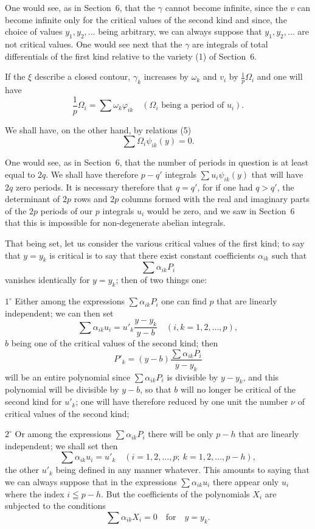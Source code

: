 \documentclass{article}
\begin{document}
One would see, as in Section~6, that the $\gamma$ cannot become infinite, since the $v$ can become infinite only for the critical values of the second kind and since, the choice of values $y_{1}, y_{2}, \ldots$ being arbitrary, we can always suppose that $y_{1}, y_{2}, \ldots$ are not critical values. One would see next that the $\gamma$ are integrals of total differentials of the first kind relative to the variety (1) of Section~6.

If the $\xi$ describe a closed contour, $\gamma_{k}$ increases by $\omega_{k}$ and $v_{i}$ by $\frac{1}{p}\Omega_{i}$ and one will have
\[
\frac{1}{p}\Omega_{i} = \sum \omega_{k}\varphi_{ik} \quad (\Omega_{i}\text{ being a period of } u_{i}).
\]

We shall have, on the other hand, by relations (5)
\[
\sum \Omega_{i}\psi_{ik}(y) = 0. \tag{6}
\]

One would see, as in Section~6, that the number of periods in question is at least equal to $2q$. We shall have therefore $p - q'$ integrals $\displaystyle\sum u_{i}\psi_{ik}(y)$ that will have $2q$ zero periods. It is necessary therefore that $q = q'$, for if one had $q > q'$, the determinant of $2p$ rows and $2p$ columns formed with the real and imaginary parts of the $2p$ periods of our $p$ integrals $u_{i}$ would be zero, and we saw in Section~6 that this is impossible for non-degenerate abelian integrals.

That being set, let us consider the various critical values of the first kind; to say that $y = y_{k}$ is critical is to say that there exist constant
coefficients $\alpha_{ik}$ such that
\[
\sum \alpha_{ik} P_{i}
\]
vanishes identically for $y = y_{k}$; then of two things one:

$1^\circ$ Either among the expressions $\displaystyle\sum \alpha_{ik} P_{i}$ one can find $p$ that are linearly independent; we can then set
\[
\sum \alpha_{ik} u_{i} = u'_{k} \frac{y - y_{k}}{y - b} \quad (i, k = 1, 2, \ldots, p),
\]
$b$ being one of the critical values of the second kind; then
\[
P'_{k} = (y - b) \frac{\sum \alpha_{ik} P_{i}}{y - y_{k}}
\]
will be an entire polynomial since $\displaystyle\sum \alpha_{ik} P_{i}$ is divisible by $y - y_{k}$, and this polynomial will be divisible by $y - b$, so that $b$ will no longer be critical of the second kind for $u'_{k}$; one will have therefore reduced by one unit the number $\nu$ of critical values of the second kind;

$2^\circ$ Or among the expressions $\displaystyle\sum \alpha_{ik} P_{i}$ there will be only $p - h$ that are linearly independent; we shall set then
\[
\sum \alpha_{ik} u_{i} = u'_{k} \quad (i = 1, 2, \ldots, p; \ k = 1, 2, \ldots, p - h),
\]
the other $u'_{k}$ being defined in any manner whatever. This amounts to saying that we can always suppose that in the expressions $\displaystyle\sum \alpha_{ik} u_{i}$ there appear only $u_{i}$ where the index $i \leqq p - h$. But the coefficients of the polynomials $X_{i}$ are subjected to the conditions
\[
\sum \alpha_{ik} X_{i} = 0 \quad \text{for} \quad y = y_{k}.
\]
\end{document}
